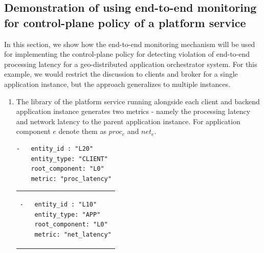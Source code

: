 \subsection{Demonstration of using end-to-end monitoring for control-plane policy of a platform service}
In this section, we show how the end-to-end monitoring mechanism will be used for implementing the control-plane policy for detecting violation of end-to-end processing latency for a geo-distributed application orchestrator system. For this example, we would restrict the discussion to clients and broker for a single application instance, but the approach generalizes to multiple instances.
\begin{enumerate}
\item The library of the platform service running alongside each client and backend application instance generates two metrics - namely the processing latency and network latency to the parent application instance. For application component $e$ denote them as $proc_e$ and $net_e$.\\
\begin{minipage}{0.45\textwidth}
\begin{verbatim}
-   entity_id : "L20"
    entity_type: "CLIENT"
    root_component: "L0"
    metric: "proc_latency"
\end{verbatim}
\end{minipage}%
\hfill
\begin{minipage}{0.45\textwidth}
\begin{tabular}{p{\textwidth}}
\begin{verbatim}
-   entity_id : "L10"
    entity_type: "APP"
    root_component: "L0"
    metric: "net_latency"
\end{verbatim}
\end{tabular}
\end{minipage}%


\end{enumerate}
